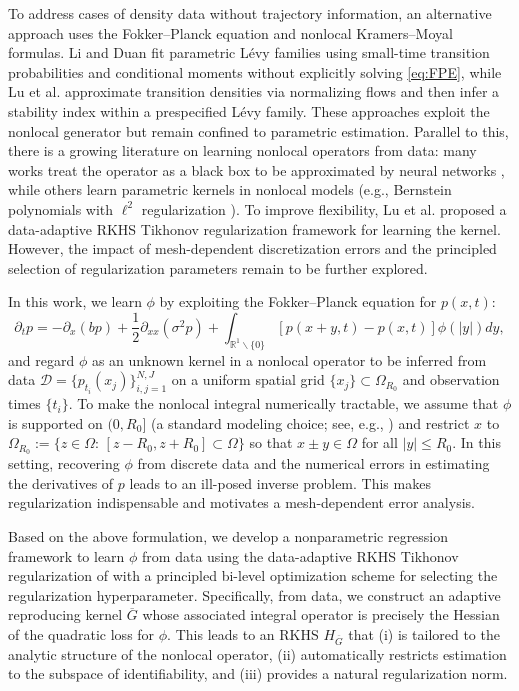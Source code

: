 \documentclass[12pt]{article}
\def\Gbar{ {\overline{G}} }
\numberwithin{equation}{section}
\numberwithin{theorem}{section}
\begin{document}
 To address cases of density data without trajectory information, an alternative approach uses the Fokker–Planck equation and nonlocal Kramers–Moyal formulas. Li and Duan \cite{li2021data} fit parametric L\'evy families using small-time transition probabilities and conditional moments without explicitly solving \eqref{eq:FPE}, while Lu et al. \cite{lu2022extracting} approximate transition densities via normalizing flows and then infer a stability index within a prespecified L\'evy family. These approaches exploit the nonlocal generator but remain confined to parametric estimation. Parallel to this, there is a growing literature on learning nonlocal operators from data: many works treat the operator as a black box to be approximated by neural networks \cite{pang2020npinns,you2022nonlocal}, while others learn parametric kernels in nonlocal models (e.g., Bernstein polynomials with $\ell^2$ regularization \cite{you2021data,fan2023bayesian}). To improve flexibility, Lu et al. \cite{lu2022data} proposed a data-adaptive RKHS Tikhonov regularization framework for learning the kernel. However, the impact of mesh-dependent discretization errors and the principled selection of regularization parameters remain to be further explored.


In this work, we learn $\phi$ by exploiting the Fokker–Planck equation for $p(x,t)$:
\begin{equation}
    \label{eq:FPE}
    \partial_t p =-\partial_x\left(b p \right)+\frac{1}{2} \partial_{x x}(\sigma^2 p) +\int_{\mathbb{R}^1 \backslash\{0\}}\left[p(x+y, t)-p(x, t)\right] \phi(|y|) d y,
\end{equation}
and regard $\phi$ as an unknown kernel in a nonlocal operator to be inferred from data $\mathcal{D}=\{p_{t_i}(x_j)\}_{i,j=1}^{N,J}$ on a uniform spatial grid $\{x_j\}\subset\Omega_{R_0}$ and observation times $\{t_i\}$. To make the nonlocal integral numerically tractable, we assume that $\phi$ is supported on $(0,R_0]$ (a standard modeling choice; see, e.g., \cite{zhang2013risk, comte2009nonparametric}) and restrict $x$ to $\Omega_{R_0}:=\{z\in\Omega:\,[z-R_0,z+R_0]\subset\Omega\}$ so that $x\pm y \in \Omega$ for all $|y|\le R_0$. In this setting, recovering $\phi$ from discrete data and the numerical errors in estimating the derivatives of $p$ leads to an ill-posed inverse problem. This makes regularization indispensable and motivates a mesh-dependent error analysis.

Based on the above formulation, we develop a nonparametric regression framework to learn $\phi$ from data using the data-adaptive RKHS Tikhonov regularization of \cite{lu2022data} with a principled bi-level optimization scheme for selecting the regularization hyperparameter. Specifically, from data, we construct an adaptive reproducing kernel $\Gbar$ whose associated integral operator is precisely the Hessian of the quadratic loss for $\phi$. This leads to an RKHS $H_{\Gbar}$ that (i) is tailored to the analytic structure of the nonlocal operator, (ii) automatically restricts estimation to the subspace of identifiability, and (iii) provides a natural regularization norm.
\end{document}
